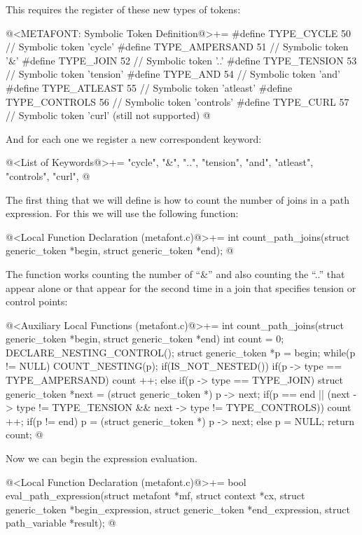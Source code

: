 This requires the register of these new types of tokens:

\iniciocodigo
@<METAFONT: Symbolic Token Definition@>+=
#define TYPE_CYCLE          50 // Symbolic token 'cycle'
#define TYPE_AMPERSAND      51 // Symbolic token '&'
#define TYPE_JOIN           52 // Symbolic token '..'
#define TYPE_TENSION        53 // Symbolic token 'tension'
#define TYPE_AND            54 // Symbolic token 'and'
#define TYPE_ATLEAST        55 // Symbolic token 'atleast'
#define TYPE_CONTROLS       56 // Symbolic token 'controls'
#define TYPE_CURL           57 // Symbolic token 'curl' (still not supported)
@
\fimcodigo

And for each one we register a new correspondent keyword:

\iniciocodigo
@<List of Keywords@>+=
"cycle", "&", "..", "tension", "and", "atleast", "controls", "curl",
@
\fimcodigo

The first thing that we will define is how to count the number of
joins in a path expression. For this we will use the following
function:

\iniciocodigo
@<Local Function Declaration (metafont.c)@>+=
int count_path_joins(struct generic_token *begin, struct generic_token *end);
@
\fimcodigo

The function works counting the number of ``\&'' and also counting the
``..'' that appear alone or that appear for the second time in a join
that specifies tension or control points:

\iniciocodigo
@<Auxiliary Local Functions (metafont.c)@>+=
int count_path_joins(struct generic_token *begin, struct generic_token *end){
int count = 0;
  DECLARE_NESTING_CONTROL();
  struct generic_token *p = begin;
  while(p != NULL){
    COUNT_NESTING(p);
    if(IS_NOT_NESTED()){
      if(p -> type == TYPE_AMPERSAND)
        count ++;
      else if(p -> type == TYPE_JOIN){
        struct generic_token *next = (struct generic_token *) p -> next;
        if(p == end || (next -> type !=  TYPE_TENSION &&
                        next -> type != TYPE_CONTROLS))
          count ++;
      }
    }
    if(p != end)
      p = (struct generic_token *) p -> next;
    else
      p = NULL;
  }
  return count;
}
@
\fimcodigo

Now we can begin the expression evaluation.

\iniciocodigo
@<Local Function Declaration (metafont.c)@>+=
bool eval_path_expression(struct metafont *mf, struct context *cx,
                          struct generic_token *begin_expression,
                          struct generic_token *end_expression,
                          struct path_variable *result);
@
\fimcodigo

